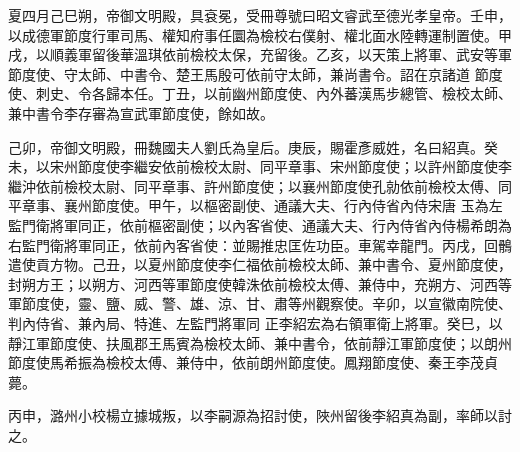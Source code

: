\begin{pinyinscope}
 夏四月己巳朔，帝御文明殿，具袞冕，受冊尊號曰昭文睿武至德光孝皇帝。壬申，以成德軍節度行軍司馬、權知府事任圜為檢校右僕射、權北面水陸轉運制置使。甲戌，以順義軍留後華溫琪依前檢校太保，充留後。乙亥，以天策上將軍、武安等軍節度使、守太師、中書令、楚王馬殷可依前守太師，兼尚書令。詔在京諸道
 節度使、刺史、令各歸本任。丁丑，以前幽州節度使、內外蕃漢馬步總管、檢校太師、兼中書令李存審為宣武軍節度使，餘如故。



 己卯，帝御文明殿，冊魏國夫人劉氏為皇后。庚辰，賜霍彥威姓，名曰紹真。癸未，以宋州節度使李繼安依前檢校太尉、同平章事、宋州節度使；以許州節度使李繼沖依前檢校太尉、同平章事、許州節度使；以襄州節度使孔勍依前檢校太傅、同平章事、襄州節度使。甲午，以樞密副使、通議大夫、行內侍省內侍宋唐
 玉為左監門衛將軍同正，依前樞密副使；以內客省使、通議大夫、行內侍省內侍楊希朗為右監門衛將軍同正，依前內客省使：並賜推忠匡佐功臣。車駕幸龍門。丙戌，回鶻遣使貢方物。己丑，以夏州節度使李仁福依前檢校太師、兼中書令、夏州節度使，封朔方王；以朔方、河西等軍節度使韓洙依前檢校太傅、兼侍中，充朔方、河西等軍節度使，靈、鹽、威、警、雄、涼、甘、肅等州觀察使。辛卯，以宣徽南院使、判內侍省、兼內局、特進、左監門將軍同
 正李紹宏為右領軍衛上將軍。癸巳，以靜江軍節度使、扶風郡王馬賓為檢校太師、兼中書令，依前靜江軍節度使；以朗州節度使馬希振為檢校太傅、兼侍中，依前朗州節度使。鳳翔節度使、秦王李茂貞薨。



 丙申，潞州小校楊立據城叛，以李嗣源為招討使，陜州留後李紹真為副，率師以討之。



\end{pinyinscope}